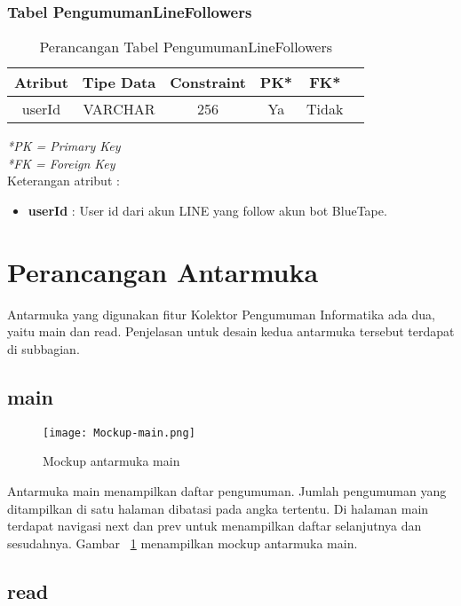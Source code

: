 \subsubsection{Tabel PengumumanLineFollowers}
\begin{center}
	\begin{table}[H]
	\caption{Perancangan Tabel PengumumanLineFollowers}
	\begin{tabular}{|c|c|c|c|c|c|}
 			\hline
			\textbf{Atribut} & \textbf{Tipe Data} & \textbf{Constraint} & \textbf{PK*}  & \textbf{FK*} \\
			\hline
			 userId & VARCHAR & 256 & Ya & Tidak\\
            \hline
	\end{tabular}
	\end{table}
\end{center}
\textit{*PK = Primary Key} \\
\textit{*FK = Foreign Key} \\

Keterangan atribut :
\begin{itemize}
\item \textbf{userId} : User id dari akun LINE yang follow akun bot BlueTape.
\end{itemize}

\section{Perancangan Antarmuka}
Antarmuka yang digunakan fitur Kolektor Pengumuman Informatika ada dua, yaitu main dan read. Penjelasan untuk desain kedua antarmuka tersebut terdapat di subbagian.

\subsection{main}

\begin{figure}[H]
	\centering  
	\texttt{[image: Mockup-main.png]}  
	\caption[Mockup antarmuka main]{Mockup antarmuka main} 
	\label{fig:mockup-main} 
\end{figure}

Antarmuka main menampilkan daftar pengumuman. Jumlah pengumuman yang ditampilkan di satu halaman dibatasi pada angka tertentu. Di halaman main terdapat navigasi next dan prev untuk menampilkan daftar selanjutnya dan sesudahnya. Gambar~ \ref{fig:mockup-main} menampilkan mockup antarmuka main.

\subsection{read}

